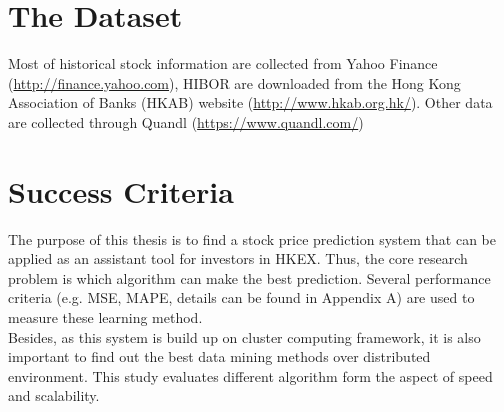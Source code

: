 \section{The Dataset}
Most of historical stock information are collected from Yahoo Finance (\url{http://finance.yahoo.com}), HIBOR are downloaded from the Hong Kong Association of Banks (HKAB) website (\url{http://www.hkab.org.hk/}). Other data are collected through Quandl (\url{https://www.quandl.com/})


\section{Success Criteria}
The purpose of this thesis is to find a stock price prediction system that can be applied as an assistant tool for investors in HKEX. Thus, the core research problem is which algorithm can make the best prediction. Several performance criteria (e.g. MSE, MAPE, details can be found in Appendix A) are used to measure these learning method.\\


Besides, as this system is build up on cluster computing framework, it is also important to find out the best data mining methods over distributed environment. This study evaluates different algorithm form the aspect of speed and scalability.



